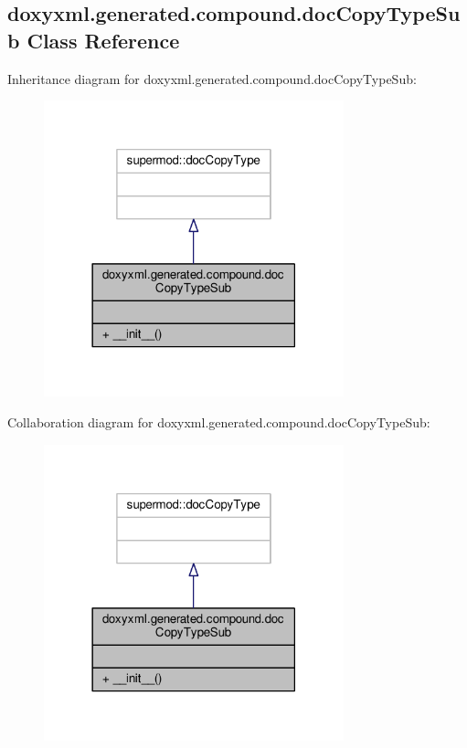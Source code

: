 \subsection{doxyxml.\+generated.\+compound.\+doc\+Copy\+Type\+Sub Class Reference}
\label{classdoxyxml_1_1generated_1_1compound_1_1docCopyTypeSub}


Inheritance diagram for doxyxml.\+generated.\+compound.\+doc\+Copy\+Type\+Sub\+:
\nopagebreak
\begin{figure}[H]
\begin{center}
\leavevmode
\includegraphics[width=246pt]{dc/d73/classdoxyxml_1_1generated_1_1compound_1_1docCopyTypeSub__inherit__graph}
\end{center}
\end{figure}


Collaboration diagram for doxyxml.\+generated.\+compound.\+doc\+Copy\+Type\+Sub\+:
\nopagebreak
\begin{figure}[H]
\begin{center}
\leavevmode
\includegraphics[width=246pt]{dd/dae/classdoxyxml_1_1generated_1_1compound_1_1docCopyTypeSub__coll__graph}
\end{center}
\end{figure}
